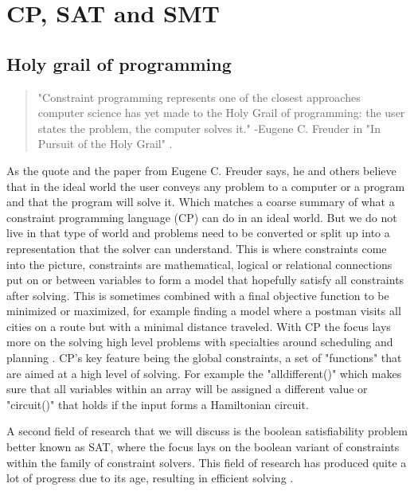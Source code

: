 \chapter{CP, SAT and SMT}
\label{cha:CS}
\label{CS:Intro}
\label{CS:HolyGrail}
\section{Holy grail of programming}
\begin{quote}
	"Constraint programming represents one of the closest approaches computer science has yet made to the Holy Grail of programming: the user states the problem, the computer solves it." 
	\newline
	-Eugene C. Freuder in "In Pursuit of the Holy Grail" \cite{11freuder1997pursuitHolyGrail}.
\end{quote}
As the quote and the paper \cite{11freuder1997pursuitHolyGrail} from Eugene C. Freuder says, he and others believe that in the ideal world the user conveys any problem to a computer or a program and that the program will solve it. Which matches a coarse summary of what a constraint programming language (CP) can do in an ideal world. But we do not live in that type of world and problems need to be converted or split up into a representation that the solver can understand. 
This is where constraints come into the picture, constraints are mathematical, logical or relational connections put on or between variables to form a model that hopefully satisfy all constraints after solving. This is sometimes combined with a final objective function to be minimized or maximized, for example finding a model where a postman visits all cities on a route but with a minimal distance traveled. 
With CP the focus lays more on the solving high level problems with specialties around scheduling and planning \cite{52bartak1999constraint}. CP's key feature being the global constraints, a set of "functions" that are aimed at a high level of solving. For example the "alldifferent()" which makes sure that all variables within an array will be assigned a different value or "circuit()" that holds if the input forms a Hamiltonian circuit.

A second field of research that we will discuss is the boolean satisfiability problem better known as SAT, where the focus lays on the boolean variant of constraints within the family of constraint solvers. This field of research has produced quite a lot of progress due to its age, resulting in efficient solving \cite{56bardin2019bringing}.

